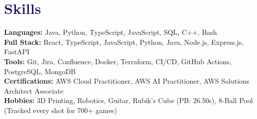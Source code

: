 \documentclass[letterpaper,11pt]{article}
\newcommand\accentColor{MidnightBlue}
\begin{document}
\section{\textcolor{\accentColor}{Skills}}
\begin{itemize}[leftmargin=0.15in, label={}]
  \small{\item{
        \textbf{Languages: }{Java, Python, TypeScript, JavaScript, SQL, C++, Bash} \\
        \textbf{Full Stack: }{React, TypeScript, JavaScript, Python, Java, Node.js, Express.js, FastAPI} \\
        \textbf{Tools: }{Git, Jira, Confluence, Docker, Terraform, CI/CD, GitHub Actions, PostgreSQL, MongoDB} \\
        \textbf{Certifications: }{AWS Cloud Practitioner, AWS AI Practitioner, AWS Solutions Architect Associate} \\
        \textbf{Hobbies: }{3D Printing, Robotics, Guitar, Rubik's Cube (PB: 26.50s), 8-Ball Pool (Tracked every shot for 700+ games)}
        }}
\end{itemize}
\vspace{-10pt}
\end{document}
